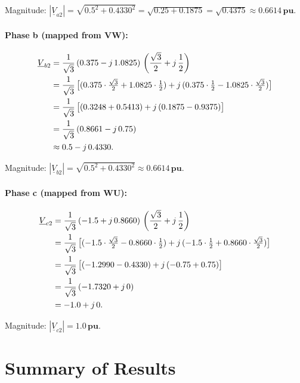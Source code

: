 \documentclass[a4paper,11pt]{article}
\begin{document}
Magnitude: $|\underline{V}_{a2}| = \sqrt{0.5^2 + 0.4330^2}
= \sqrt{0.25 + 0.1875} = \sqrt{0.4375} \approx \mathbf{0.6614\,pu}$.

\paragraph{Phase b (mapped from VW):}
\begin{align}
\underline{V}_{b2} &= \frac{1}{\sqrt{3}}\,(0.375 - j\,1.0825)\,
   \left(\frac{\sqrt{3}}{2} + j\,\frac{1}{2}\right) \notag\\
&= \frac{1}{\sqrt{3}}\,
   \bigl[(0.375\cdot\tfrac{\sqrt{3}}{2} + 1.0825\cdot\tfrac{1}{2})
   + j\,(0.375\cdot\tfrac{1}{2} - 1.0825\cdot\tfrac{\sqrt{3}}{2})\bigr] \notag\\
&= \frac{1}{\sqrt{3}}\,
   \bigl[(0.3248 + 0.5413) + j\,(0.1875 - 0.9375)\bigr] \notag\\
&= \frac{1}{\sqrt{3}}\,(0.8661 - j\,0.75) \notag\\
&\approx 0.5 - j\,0.4330.
\end{align}

Magnitude: $|\underline{V}_{b2}| = \sqrt{0.5^2 + 0.4330^2} \approx \mathbf{0.6614\,pu}$.

\paragraph{Phase c (mapped from WU):}
\begin{align}
\underline{V}_{c2} &= \frac{1}{\sqrt{3}}\,(-1.5 + j\,0.8660)\,
   \left(\frac{\sqrt{3}}{2} + j\,\frac{1}{2}\right) \notag\\
&= \frac{1}{\sqrt{3}}\,
   \bigl[(-1.5\cdot\tfrac{\sqrt{3}}{2} - 0.8660\cdot\tfrac{1}{2})
   + j\,(-1.5\cdot\tfrac{1}{2} + 0.8660\cdot\tfrac{\sqrt{3}}{2})\bigr] \notag\\
&= \frac{1}{\sqrt{3}}\,
   \bigl[(-1.2990 - 0.4330) + j\,(-0.75 + 0.75)\bigr] \notag\\
&= \frac{1}{\sqrt{3}}\,(-1.7320 + j\,0) \notag\\
&= -1.0 + j\,0.
\end{align}

Magnitude: $|\underline{V}_{c2}| = \mathbf{1.0\,pu}$.

\section{Summary of Results}
\label{sec:summary}
\end{document}
